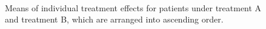 	\begin{figure}[ht!]
		\begin{center}
			\\
		\end{center}
		\caption{Means of individual treatment effects for patients under treatment A and treatment B, which are arranged into ascending order.}
		\label{fig4_7}
	\end{figure}
	
